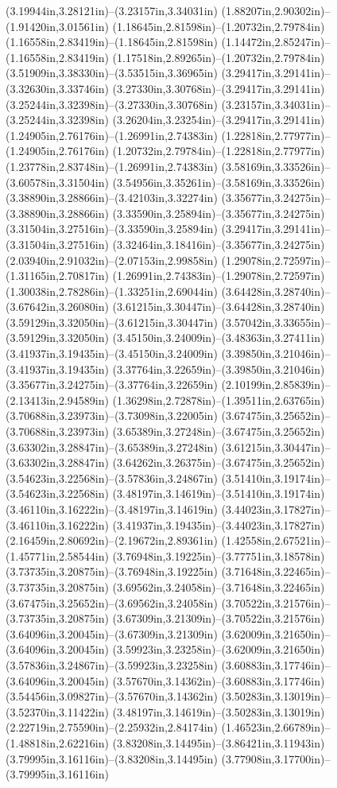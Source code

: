 (3.19944in,3.28121in)--(3.23157in,3.34031in) (1.88207in,2.90302in)--(1.91420in,3.01561in) (1.18645in,2.81598in)--(1.20732in,2.79784in) (1.16558in,2.83419in)--(1.18645in,2.81598in) (1.14472in,2.85247in)--(1.16558in,2.83419in) (1.17518in,2.89265in)--(1.20732in,2.79784in) (3.51909in,3.38330in)--(3.53515in,3.36965in) (3.29417in,3.29141in)--(3.32630in,3.33746in) (3.27330in,3.30768in)--(3.29417in,3.29141in) (3.25244in,3.32398in)--(3.27330in,3.30768in) (3.23157in,3.34031in)--(3.25244in,3.32398in) (3.26204in,3.23254in)--(3.29417in,3.29141in) (1.24905in,2.76176in)--(1.26991in,2.74383in) (1.22818in,2.77977in)--(1.24905in,2.76176in) (1.20732in,2.79784in)--(1.22818in,2.77977in) (1.23778in,2.83748in)--(1.26991in,2.74383in) (3.58169in,3.33526in)--(3.60578in,3.31504in) (3.54956in,3.35261in)--(3.58169in,3.33526in) (3.38890in,3.28866in)--(3.42103in,3.32274in) (3.35677in,3.24275in)--(3.38890in,3.28866in) (3.33590in,3.25894in)--(3.35677in,3.24275in) (3.31504in,3.27516in)--(3.33590in,3.25894in) (3.29417in,3.29141in)--(3.31504in,3.27516in) (3.32464in,3.18416in)--(3.35677in,3.24275in) (2.03940in,2.91032in)--(2.07153in,2.99858in) (1.29078in,2.72597in)--(1.31165in,2.70817in) (1.26991in,2.74383in)--(1.29078in,2.72597in) (1.30038in,2.78286in)--(1.33251in,2.69044in) (3.64428in,3.28740in)--(3.67642in,3.26080in) (3.61215in,3.30447in)--(3.64428in,3.28740in) (3.59129in,3.32050in)--(3.61215in,3.30447in) (3.57042in,3.33655in)--(3.59129in,3.32050in) (3.45150in,3.24009in)--(3.48363in,3.27411in) (3.41937in,3.19435in)--(3.45150in,3.24009in) (3.39850in,3.21046in)--(3.41937in,3.19435in) (3.37764in,3.22659in)--(3.39850in,3.21046in) (3.35677in,3.24275in)--(3.37764in,3.22659in) (2.10199in,2.85839in)--(2.13413in,2.94589in) (1.36298in,2.72878in)--(1.39511in,2.63765in) (3.70688in,3.23973in)--(3.73098in,3.22005in) (3.67475in,3.25652in)--(3.70688in,3.23973in) (3.65389in,3.27248in)--(3.67475in,3.25652in) (3.63302in,3.28847in)--(3.65389in,3.27248in) (3.61215in,3.30447in)--(3.63302in,3.28847in) (3.64262in,3.26375in)--(3.67475in,3.25652in) (3.54623in,3.22568in)--(3.57836in,3.24867in) (3.51410in,3.19174in)--(3.54623in,3.22568in) (3.48197in,3.14619in)--(3.51410in,3.19174in) (3.46110in,3.16222in)--(3.48197in,3.14619in) (3.44023in,3.17827in)--(3.46110in,3.16222in) (3.41937in,3.19435in)--(3.44023in,3.17827in) (2.16459in,2.80692in)--(2.19672in,2.89361in) (1.42558in,2.67521in)--(1.45771in,2.58544in) (3.76948in,3.19225in)--(3.77751in,3.18578in) (3.73735in,3.20875in)--(3.76948in,3.19225in) (3.71648in,3.22465in)--(3.73735in,3.20875in) (3.69562in,3.24058in)--(3.71648in,3.22465in) (3.67475in,3.25652in)--(3.69562in,3.24058in) (3.70522in,3.21576in)--(3.73735in,3.20875in) (3.67309in,3.21309in)--(3.70522in,3.21576in) (3.64096in,3.20045in)--(3.67309in,3.21309in) (3.62009in,3.21650in)--(3.64096in,3.20045in) (3.59923in,3.23258in)--(3.62009in,3.21650in) (3.57836in,3.24867in)--(3.59923in,3.23258in) (3.60883in,3.17746in)--(3.64096in,3.20045in) (3.57670in,3.14362in)--(3.60883in,3.17746in) (3.54456in,3.09827in)--(3.57670in,3.14362in) (3.50283in,3.13019in)--(3.52370in,3.11422in) (3.48197in,3.14619in)--(3.50283in,3.13019in) (2.22719in,2.75590in)--(2.25932in,2.84174in) (1.46523in,2.66789in)--(1.48818in,2.62216in) (3.83208in,3.14495in)--(3.86421in,3.11943in) (3.79995in,3.16116in)--(3.83208in,3.14495in) (3.77908in,3.17700in)--(3.79995in,3.16116in) 
